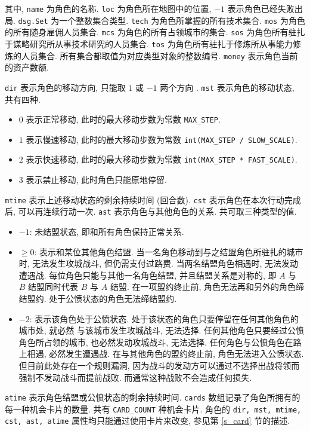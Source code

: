 \documentclass[UTF8, zihao=-4]{ctexart} %
\newcommand{\lcode}{\lstinline} % 段内插入代码
\begin{document}
其中, \lcode{name} 为角色的名称. \lcode{loc} 为角色所在地图中的位置, $-1$ 表示角色已经失败出局.
\lcode{dsg.Set} 为一个整数集合类型. \lcode{tech} 为角色所掌握的所有技术集合.
\lcode{mos} 为角色的所有随身雇佣人员集合. \lcode{mcs} 为角色的所有占领城市的集合.
\lcode{sos} 为角色所有驻扎于谋略研究所从事技术研究的人员集合.
\lcode{tos} 为角色所有驻扎于修炼所从事能力修炼的人员集合.
所有集合都取值为对应类型对象的整数编号. \lcode{money} 表示角色当前的资产数额.

\lcode{dir} 表示角色的移动方向, 只能取 $1$ 或 $-1$ 两个方向 .
\lcode{mst} 表示角色的移动状态, 共有四种. 
\begin{itemize}
    \item $0$ 表示正常移动, 此时的最大移动步数为常数 \lcode{MAX_STEP}.
    \item $1$ 表示慢速移动, 此时的最大移动步数为常数 \lcode{int(MAX_STEP / SLOW_SCALE)}.
    \item $2$ 表示快速移动, 此时的最大移动步数为常数 \lcode{int(MAX_STEP * FAST_SCALE)}.
    \item $3$ 表示禁止移动, 此时角色只能原地停留.
\end{itemize}
\lcode{mtime} 表示上述移动状态的剩余持续时间 (回合数). 
\lcode{cst} 表示角色在本次行动完成后, 可以再连续行动一次. 
\lcode{ast} 表示角色与其他角色的关系. 共可取三种类型的值.
\begin{itemize}
    \item $-1$: 未结盟状态, 即和所有角色保持正常关系.
    \item $\ge 0$: 表示和某位其他角色结盟. 当一名角色移动到与之结盟角色所驻扎的城市时, 无法发生攻城战斗, 
        但仍需支付过路费. 当两名结盟角色相遇时, 无法发动遭遇战. 
        每位角色只能与其他一名角色结盟, 并且结盟关系是对称的, 即 $A$ 与 $B$ 结盟同时代表 $B$ 与 $A$ 结盟.
        在一项盟约终止前, 角色无法再和另外的角色缔结盟约. 处于公愤状态的角色无法缔结盟约.
    \item $-2$: 表示该角色处于公愤状态. 处于该状态的角色只要停留在任何其他角色的城市处, 就必然
        与该城市发生攻城战斗, 无法选择. 任何其他角色只要经过公愤角色所占领的城市, 也必然发动攻城战斗, 无法选择.
        任何角色与公愤角色在路上相遇, 必然发生遭遇战. 在与其他角色的盟约终止前, 角色无法进入公愤状态. 
        但目前此处存在一个规则漏洞, 因为战斗的发动方可以通过不选择出战将领而强制不发动战斗而提前战败.
        而通常这种战败不会造成任何损失.
\end{itemize}
\lcode{atime} 表示角色结盟或公愤状态的剩余持续时间. \lcode{cards} 数组记录了角色所拥有的每一种机会卡片的数量.
共有 \lcode{CARD_COUNT} 种机会卡片. 
角色的 \lcode{dir, mst, mtime, cst, ast, atime} 属性均只能通过使用卡片来改变, 参见第 \ref{s_card} 节的描述. 
\end{document}
